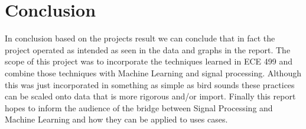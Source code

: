 \documentclass[conference,twoside]{IEEEtran}
\begin{document}
\section{Conclusion}
In conclusion based on the projects result we can conclude that in fact the project operated as intended as seen in the data and graphs in the report. The scope of this project was to incorporate the techniques learned in ECE 499 and combine those techniques with Machine Learning and signal processing. Although this was just incorporated in something as simple as bird sounds these practices can be scaled onto data that is more rigorous and/or import. Finally this report hopes to inform the audience of the bridge between Signal Processing and Machine Learning and how they can be applied to uses cases.




%


\end{document}
